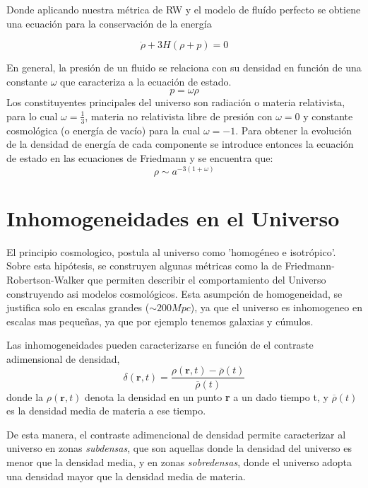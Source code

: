 Donde aplicando nuestra m\'etrica de RW y el modelo de flu\'ido perfecto se obtiene una ecuaci\'on para la conservaci\'on de la energ\'ia

\begin{equation}
    \dot{\rho}+3H(\rho + p)=0
\end{equation}{}

En general, la presi\'on de un fluido se relaciona con su densidad en funci\'on de una constante $\omega$ que caracteriza a la ecuaci\'on de estado. 
\begin{equation}
    p=\omega\rho
\end{equation}{}
Los constituyentes principales del universo son radiaci\'on o materia relativista, para lo cual $\omega=\frac{1}{3}$, materia no relativista libre de presi\'on con $\omega=0$ y constante cosmol\'ogica (o energ\'ia de vac\'io) para la cual $\omega=-1$.
Para obtener la evoluci\'on de la densidad de energ\'ia de cada componente se introduce entonces la ecuaci\'on de estado en las ecuaciones de Friedmann y se encuentra que:
\begin{equation}
    \rho \sim a^{-3(1+\omega) }
\end{equation}{}



\section{Inhomogeneidades en el Universo}

El principio cosmologico, postula al universo como 'homog\'eneo e isotr\'opico'. Sobre esta hip\'otesis, se construyen algunas m\'etricas como la de Friedmann-Robertson-Walker que permiten describir el comportamiento del Universo construyendo asi modelos cosmol\'ogicos. Esta asumpci\'on de homogeneidad, se justifica solo en escalas grandes ($\sim 200 Mpc$), ya que el universo es inhomogeneo en escalas mas peque\~nas, ya que por ejemplo tenemos galaxias y c\'umulos. 

Las inhomogeneidades pueden caracterizarse en funci\'on de el contraste adimensional de densidad,
\begin{equation}
    \delta(\textbf{r},t)=\frac{\rho(\textbf{r},t) - \overline{\rho}(t)}{\overline{\rho}(t)}
    \label{ContrasteDensidad}
\end{equation}{}
donde la $\rho(\textbf{r},t)$ denota la densidad en un punto \textbf{r} a un dado tiempo t, y $\overline{\rho}(t)$ es la densidad media de materia a ese tiempo.  

De esta manera, el contraste adimencional de densidad permite caracterizar al universo en zonas \textit{subdensas}, que son aquellas donde la densidad del universo es menor que la densidad media, y en zonas \textit{sobredensas}, donde el universo adopta una densidad mayor que la densidad media de materia.



